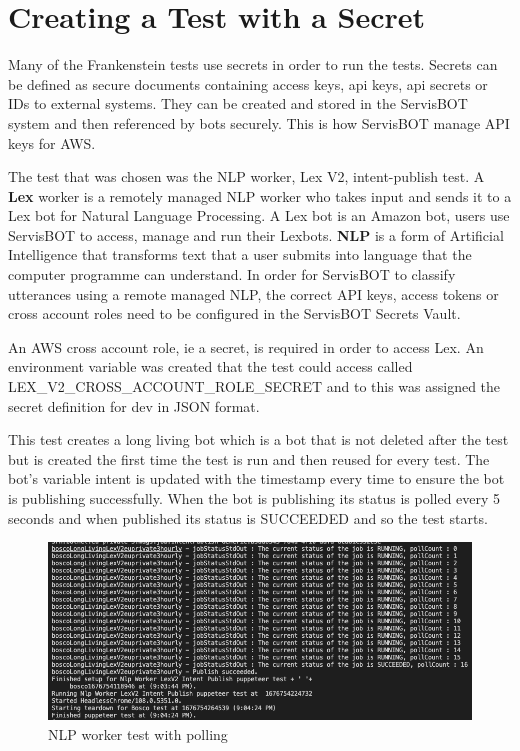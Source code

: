 \documentclass[12pt,a4paper,titlepage]{report}
\begin{document}
\section{Creating a Test with a Secret}
Many of the Frankenstein tests use secrets in order to run the tests. Secrets can be defined as secure documents containing access keys, api keys, api secrets or IDs to external systems. They can be created and stored in the ServisBOT system and then referenced by bots securely. This is how ServisBOT manage API keys for AWS.

The test that was chosen was the NLP worker, Lex V2, intent-publish test. A \textbf{Lex} worker is a remotely managed NLP worker who takes input and sends it to a Lex bot for Natural Language Processing. A Lex bot is an Amazon bot, users use ServisBOT to access, manage and run their Lexbots. 
\textbf{NLP} is a form of Artificial Intelligence that transforms text that a user submits into language that the computer programme can understand. In order for ServisBOT to classify utterances using a remote managed NLP, the correct API keys, access tokens or cross account roles need to be configured in the ServisBOT Secrets Vault.

An AWS cross account role, ie a secret, is required in order to access Lex. An environment variable was created that the test could access called LEX\_V2\_CROSS\_ACCOUNT\_ROLE\_SECRET and to this was assigned the secret definition for dev in JSON format. 

This test creates a long living bot which is a bot that is not deleted after the test but is created the first time the test is run and then reused for every test. The bot's variable intent is updated with the timestamp every time to ensure the bot is publishing successfully. When the bot is publishing its status is polled every 5 seconds and when published its status is SUCCEEDED and so the test starts.

\begin{figure}[ht]
  \centering
  \includegraphics[width=15cm]{./diagrams/nlp_worker_poll.png}
  \caption{NLP worker test with polling}
\end{figure}
\end{document}
